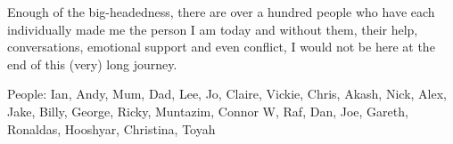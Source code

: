 Enough of the big-headedness, there are over a hundred people who have each individually made me the person I am today and without them, their help, conversations, emotional support and even conflict, I would not be here at the end of this (very) long journey.

People: Ian, Andy, Mum, Dad, Lee, Jo, Claire, Vickie, Chris, Akash, Nick, Alex, Jake, Billy, George, Ricky, Muntazim, Connor W, Raf, Dan, Joe, Gareth, Ronaldas, Hooshyar, Christina, Toyah